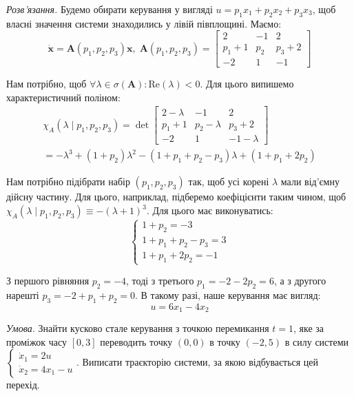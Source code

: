 \documentclass[oneside,solution]{karazin-control-assign}
\begin{document}
\textit{Розв'язання.} Будемо обирати керування у вигляді $u=p_1x_1+p_2x_2+p_3x_3$, щоб власні значення системи знаходились у лівій півплощині. Маємо:
\begin{equation}
    \dot{\mathbf{x}} = \boldsymbol{A}(p_1,p_2,p_3)\mathbf{x}, \; \boldsymbol{A}(p_1,p_2,p_3) = \begin{bmatrix}
        2 & -1 & 2 \\
        p_1+1 & p_2 & p_3+2 \\
        -2 & 1 & -1
    \end{bmatrix}
\end{equation}

Нам потрібно, щоб $\forall \lambda \in \sigma(\boldsymbol{A}): \text{Re}(\lambda) < 0$. Для цього випишемо характеристичний поліном:
\begin{gather}
    \chi_A(\lambda \mid p_1,p_2,p_3) = \det \begin{bmatrix}
        2 - \lambda & -1 & 2 \\
        p_1 + 1 & p_2 - \lambda & p_3 + 2 \\
        -2 & 1 & -1-\lambda
    \end{bmatrix} \nonumber \\
    =-\lambda^3 + (1+p_2)\lambda^2 - (1+p_1+p_2-p_3)\lambda + (1+p_1+2p_2)
\end{gather}

Нам потрібно підібрати набір $(p_1,p_2,p_3)$ так, щоб усі корені $\lambda$ мали від'ємну дійсну частину. Для цього, наприклад, підберемо коефіцієнти таким чином, щоб $\chi_A(\lambda \mid p_1,p_2,p_3) \equiv -(\lambda+1)^3$. Для цього має виконуватись:
\begin{equation}
    \begin{cases}
        1+p_2 = -3 \\
        1+p_1+p_2-p_3 = 3 \\
        1 + p_1 + 2p_2 = -1
    \end{cases}
\end{equation}

З першого рівняння $p_2=-4$, тоді з третього $p_1=-2-2p_2=6$, а з другого нарешті $p_3=-2+p_1+p_2=0$. В такому разі, наше керування має вигляд:
\begin{equation}
    u = 6x_1 - 4x_2
\end{equation}


\hspace{20px}\textit{Умова.} Знайти кусково стале керування з точкою перемикання $t=1$, яке за проміжок часу $[0,3]$ переводить точку $(0,0)$ в точку $(-2,5)$ в силу системи $\begin{cases}
    \dot{x}_1 = 2u \\ \dot{x}_2 = 4x_1-u
\end{cases}$. Виписати траєкторію системи, за якою відбувається цей перехід.
\end{document}
